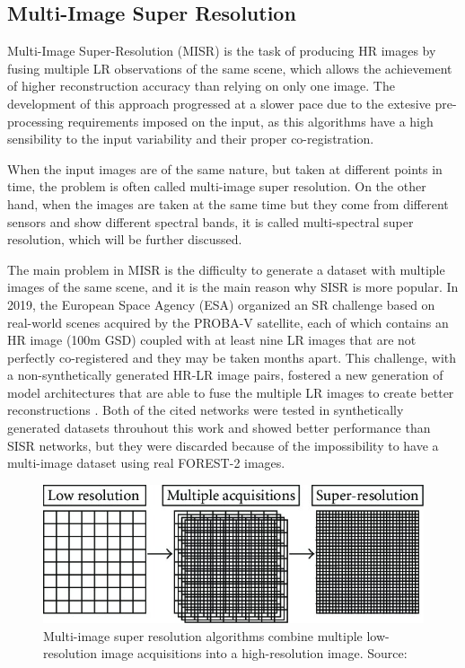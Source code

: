        




    \subsection{Multi-Image Super Resolution}

        Multi-Image Super-Resolution (MISR) is the task of producing HR images by fusing multiple LR observations of the same scene, which allows the achievement of higher reconstruction accuracy than relying on only one image.
        The development of this approach progressed at a slower pace due to the extesive pre-processing requirements imposed on the input, as this algorithms have a high sensibility to the input variability and their proper co-registration.  

        When the input images are of the same nature, but taken at different points in time, the problem is often called multi-image super resolution.
        On the other hand, when the images are taken at the same time but they come from different sensors and show different spectral bands, it is called multi-spectral super resolution, which will be further discussed. 

        The main problem in MISR is the difficulty to generate a dataset with multiple images of the same scene, and it is the main reason why SISR is more popular.
        In 2019, the European Space Agency (ESA) organized an SR challenge  \cite{martens2019superresolution} based on real-world scenes acquired by the PROBA-V satellite, each of which contains an HR image (100m GSD) coupled with at least nine LR images that are not perfectly co-registered and they may be taken months apart. 
        This challenge, with a non-synthetically generated HR-LR image pairs, fostered a new generation of model architectures that are able to fuse the multiple LR images to create better reconstructions \cite{Salvetti_2020,Bordone_Molini_2020}.
         Both of the cited networks were tested in synthetically generated datasets throuhout this work and showed better performance than SISR networks, but they were discarded because of the impossibility to have a multi-image dataset using real FOREST-2 images.

        \begin{figure}[H]
            \centering
            \includegraphics[width=\textwidth]{Includes/2-MISR.jpeg}
            \caption{Multi-image super resolution algorithms combine multiple low-resolution image acquisitions into a high-resolution image. Source: \cite{MISR2007}}
            \label{fig:2-MISR}
        \end{figure}
        
